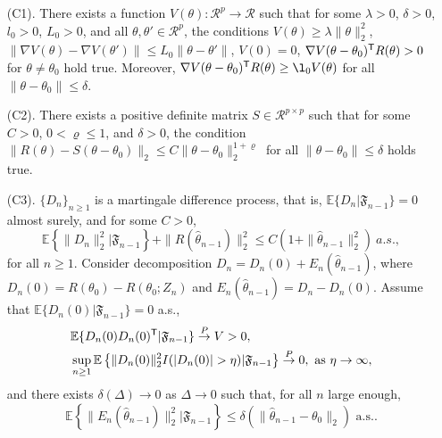 \documentclass[12pt]{article}
\def\trans{^{\rm \textsf{T}}}
\def\wh{\widehat}
\begin{document}
\begin{enumerate}
\item[(C1).] There exists a function $V(\theta): \mathcal{R}^p \rightarrow \mathcal{R}$ such that for some $\lambda>0$, $\delta>0$, $l_0>0$, $L_0>0$, and all $\theta, \theta'\in \mathcal{R}^p$, the conditions $V(\theta)\geq \lambda\|\theta\|_2^2$, $\|\nabla V(\theta) - \nabla V(\theta')\|\leq L_0\|\theta-\theta'\|$, $V(0)=0$, $\nabla V(\theta-\theta_0)\trans R(\theta)>0$ for $\theta\neq \theta_0$ hold true. Moreover, $\nabla V(\theta-\theta_0)\trans R(\theta)\geq \l_0 V(\theta)$ for all $\|\theta-\theta_0\|\leq \delta$.

\item[(C2).] There exists a positive definite matrix $S\in \mathcal{R}^{p\times p}$ such that for some $C>0$, $0<\varrho\leq 1$, and $\delta>0$, the condition $\|R(\theta)-S(\theta-\theta_0)\|_2 \leq C\|\theta-\theta_0\|_2^{1+\varrho}$ for all $\|\theta-\theta_0\|\leq \delta$ holds true.

\item[(C3).] $\{D_n\}_{n\geq 1}$ is a martingale difference process, that is, $\mathbb{E}\{D_n|\mathfrak{F}_{n-1}\}=0$ almost surely, and for some $C>0$,
$$\mathbb{E}\left\{\|D_n\|^2_2|\mathfrak{F}_{n-1}\right\}+\|R(\wh{\theta}_{n-1})\|_2^2\leq C\left(1+\|\wh{\theta}_{n-1}\|_2^2\right)\ a.s., $$
for all $n\geq 1$. Consider decomposition $D_n=D_n(0)+E_n(\wh{\theta}_{n-1})$, where $D_n(0)=R(\theta_0)-\wh{R}(\theta_0; Z_n)$ and $E_n(\wh{\theta}_{n-1})=D_n-D_n(0)$. Assume that $\mathbb{E}\{D_n(0)|\mathfrak{F}_{n-1}\}=0$ a.s.,
\begin{eqnarray*}
&\mathbb{E}\{D_n(0)D_n(0)\trans|\mathfrak{F}_{n-1}\}\overset{P}{\rightarrow} V>0, \\
&\sup_{n\geq 1}\mathbb{E}\left\{\|D_n(0)\|_2^2I(|D_n(0)|>\eta)|\mathfrak{F}_{n-1}\right\}\overset{P}{\rightarrow} 0, \mbox{\ as\ }\eta\rightarrow\infty,
\end{eqnarray*}
and there exists $\delta(\Delta)\rightarrow 0$ as $\Delta\rightarrow 0$ such that, for all $n$ large enough,
$$\mathbb{E}\left\{\|E_n(\wh{\theta}_{n-1})\|_2^2|\mathfrak{F}_{n-1}\right\}\leq \delta(\|\wh{\theta}_{n-1}-\theta_0\|_2) \mbox{\ \  a.s..}$$
\end{enumerate}
\end{document}
